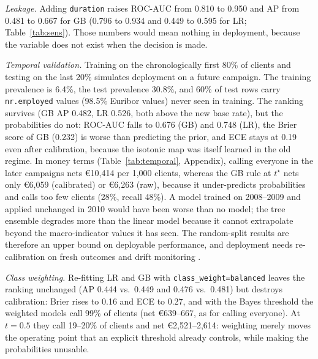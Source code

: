 \documentclass[conference]{IEEEtran}
\begin{document}
\emph{Leakage.} Adding \texttt{duration} raises ROC-AUC from 0.810 to 0.950 and AP from 0.481 to 0.667 for GB (0.796 to 0.934 and 0.449 to 0.595 for LR; Table~\ref{tab:sens}). Those numbers would mean nothing in deployment, because the variable does not exist when the decision is made.

\emph{Temporal validation.} Training on the chronologically first 80\% of clients and testing on the last 20\% simulates deployment on a future campaign. The training prevalence is 6.4\%, the test prevalence 30.8\%, and 60\% of test rows carry \texttt{nr.employed} values (98.5\% Euribor values) never seen in training. The ranking survives (GB AP 0.482, LR 0.526, both above the new base rate), but the probabilities do not: ROC-AUC falls to 0.676 (GB) and 0.748 (LR), the Brier score of GB (0.232) is worse than predicting the prior, and ECE stays at 0.19 even after calibration, because the isotonic map was itself learned in the old regime. In money terms (Table~\ref{tab:temporal}, Appendix), calling everyone in the later campaigns nets \euro10,414 per 1,000 clients, whereas the GB rule at $t^\star$ nets only \euro6,059 (calibrated) or \euro6,263 (raw), because it under-predicts probabilities and calls too few clients (28\%, recall 48\%). A model trained on 2008--2009 and applied unchanged in 2010 would have been worse than no model; the tree ensemble degrades more than the linear model because it cannot extrapolate beyond the macro-indicator values it has seen. The random-split results are therefore an upper bound on deployable performance, and deployment needs re-calibration on fresh outcomes and drift monitoring \cite{morenotorres2012}.

\emph{Class weighting.} Re-fitting LR and GB with \texttt{class\_weight=balanced} leaves the ranking unchanged (AP 0.444 vs.\ 0.449 and 0.476 vs.\ 0.481) but destroys calibration: Brier rises to 0.16 and ECE to 0.27, and with the Bayes threshold the weighted models call 99\% of clients (net \euro639--667, as for calling everyone). At $t=0.5$ they call 19--20\% of clients and net \euro2,521--2,614: weighting merely moves the operating point that an explicit threshold already controls, while making the probabilities unusable.
\end{document}
